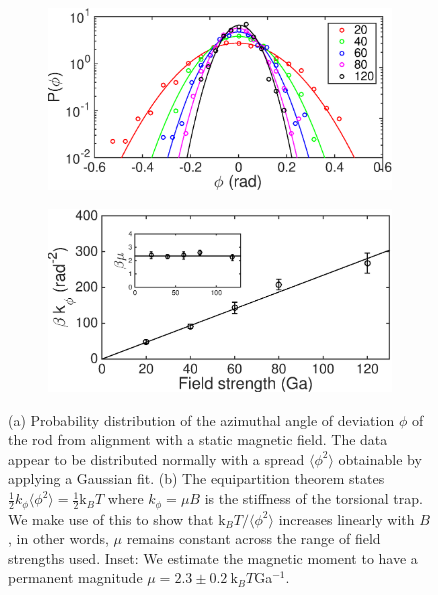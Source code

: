 \documentclass[aps,prl,twocolumn,superscriptaddress]{revtex4-1}
\newcommand{\kk}{\mathrm{k}_B}
\begin{document}
\begin{figure}
	\begin{subfigure}[b]{0.95\columnwidth}
    	\includegraphics[width=\textwidth]{figs/Figure2a.eps}
    	\caption{}
    \end{subfigure}
    \begin{subfigure}[b]{0.95\columnwidth}
    	\includegraphics[width=\textwidth]{figs/Figure2b.eps}
    	\caption{}
    \end{subfigure}
    \caption{\footnotesize (a) Probability distribution of the azimuthal angle of deviation $\phi$ of the rod from alignment with a static magnetic field. The data appear to be distributed normally with a spread $\langle \phi^2 \rangle$ obtainable by applying a Gaussian fit. (b) The equipartition theorem states $\frac{1}{2} k_\phi \langle \phi^2 \rangle = \frac{1}{2}\kk T$ where $k_\phi =\mu B$ is the stiffness of the torsional trap. We make use of this to show that $\kk T / \langle \phi^2 \rangle $ increases linearly with $B$, in other words, $\mu$ remains constant across the range of field strengths used. Inset: We estimate the magnetic moment to have a permanent magnitude $\mu = 2.3\pm0.2 \ \kk T$Ga$^{-1}$.\label{fig:trap}}
	\label{fig:moment}
\end{figure}
\end{document}
